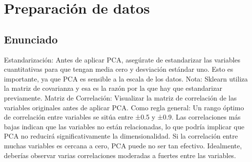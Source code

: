 \newpage
\section{Preparación de datos}
\subsection{Enunciado}
Estandarización: Antes de aplicar PCA, asegúrate de estandarizar las variables cuantitativas para que tengan media cero y desviación estándar uno. Esto es importante, ya que PCA es sensible a la escala de los datos. Nota: Sklearn utiliza la matriz de covarianza y esa es la razón por la que hay que estandarizar previamente.
Matriz de Correlación: Visualizar la matriz de correlación de las variables originales antes de aplicar PCA. Como regla general:
Un rango óptimo de correlación entre variables se sitúa entre ±0.5 y ±0.9. Las correlaciones más bajas indican que las variables no están relacionadas, lo que podría implicar que PCA no reducirá significativamente la dimensionalidad.
Si la correlación entre muchas variables es cercana a cero, PCA puede no ser tan efectivo. Idealmente, deberías observar varias correlaciones moderadas a fuertes entre las variables.

